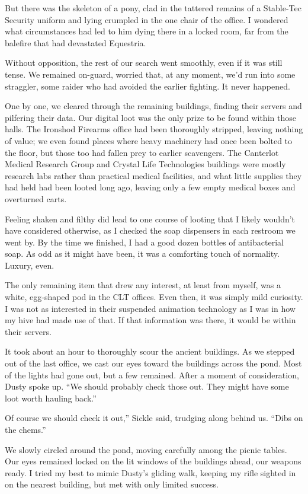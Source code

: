 But there was the skeleton of a pony, clad in the tattered remains of a Stable-Tec Security uniform and lying crumpled in the one chair of the office. I wondered what circumstances had led to him dying there in a locked room, far from the balefire that had devastated Equestria.

Without opposition, the rest of our search went smoothly, even if it was still tense. We remained on-guard, worried that, at any moment, we’d run into some straggler, some raider who had avoided the earlier fighting. It never happened.

One by one, we cleared through the remaining buildings, finding their servers and pilfering their data. Our digital loot was the only prize to be found within those halls. The Ironshod Firearms office had been thoroughly stripped, leaving nothing of value; we even found places where heavy machinery had once been bolted to the floor, but those too had fallen prey to earlier scavengers. The Canterlot Medical Research Group and Crystal Life Technologies buildings were mostly research labs rather than practical medical facilities, and what little supplies they had held had been looted long ago, leaving only a few empty medical boxes and overturned carts.

Feeling shaken and filthy did lead to one course of looting that I likely wouldn’t have considered otherwise, as I checked the soap dispensers in each restroom we went by. By the time we finished, I had a good dozen bottles of antibacterial soap. As odd as it might have been, it was a comforting touch of normality. Luxury, even.

The only remaining item that drew any interest, at least from myself, was a white, egg-shaped pod in the CLT offices. Even then, it was simply mild curiosity. I was not as interested in their suspended animation technology as I was in how my hive had made use of that. If that information was there, it would be within their servers.

It took about an hour to thoroughly scour the ancient buildings. As we stepped out of the last office, we cast our eyes toward the buildings across the pond. Most of the lights had gone out, but a few remained. After a moment of consideration, Dusty spoke up. “We should probably check those out. They might have some loot worth hauling back.”

\leavevmode{}Of course we should check it out,” Sickle said, trudging along behind us. “Dibs on the chems.”

We slowly circled around the pond, moving carefully among the picnic tables. Our eyes remained locked on the lit windows of the buildings ahead, our weapons ready. I tried my best to mimic Dusty’s gliding walk, keeping my rifle sighted in on the nearest building, but met with only limited success.

